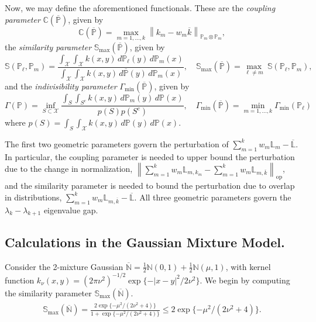 \documentclass{article}
\newcommand{\norm}[1]{\left\lVert#1\right\rVert}
\newcommand{\abs}[1]{\left \lvert #1 \right \rvert}
\newcommand{\1}{\mathbb{I}}
\newcommand{\Xset}{\mathcal{X}}
\newcommand{\Pbb}{\mathbb{P}}
\theoremstyle{alden}
\theoremstyle{aldenthm}
\theoremstyle{definition}
\theoremstyle{remark}
\begin{document}
Now, we may define the aforementioned functionals. These are the \emph{coupling parameter} $\mathbb{C}(\overline{\Pbb})$, given by
\begin{equation*}
\mathbb{C}(\overline{\Pbb}) = \max_{m = 1,\ldots,k} \norm{k_m - w_m\overline{k}}_{\Pbb_m \otimes \Pbb_m},
\end{equation*}
the \emph{similarity parameter} $\mathbb{S}_{\textrm{max}}(\overline{\Pbb})$, given by
\begin{equation*}
\mathbb{S}(\Pbb_{\ell}, \Pbb_{m}) = \frac{\int_{\Xset} \int_{\Xset} k(x,y) \,d\Pbb_{\ell}(y) \,d\Pbb_{m}(x)}{\int_{\Xset} \int_{\Xset} k(x,y) \,d\overline{\Pbb}(y) \,d\Pbb_{m}(x)}, \quad \mathbb{S}_{\textrm{max}}(\overline{\Pbb}) = \max_{\ell \neq m}~ \mathbb{S}(\Pbb_{\ell}, \Pbb_{m}),
\end{equation*}
and the \emph{indivisibility parameter} $\Gamma_{\textrm{min}}(\overline{\Pbb})$, given by
\begin{equation*}
\Gamma(\Pbb) = \inf_{S \subset \Xset }\frac{\int_{S} \int_{S^c} k(x,y) \,d\Pbb_m(y) \,d\Pbb(x)}{p(S)p(S^c)}, \quad \Gamma_{\textrm{min}}(\overline{\Pbb}) = \min_{m = 1,\ldots,k} \Gamma_{\min}(\Pbb_{\ell})
\end{equation*}
where $p(S) = \int_{S} \int_{\mathcal{X}} k(x,y) \,d\Pbb(y) \,d\Pbb(x)$.

The first two geometric parameters govern the perturbation of $\sum_{m = 1}^{k} w_m \mathbb{L}_m - \overline{\mathbb{L}}.$ In particular, the coupling parameter is needed to upper bound the perturbation due to the change in normalization, $\norm{\sum_{m = 1}^{k}w_m\mathbb{L}_{m,k_m} - \sum_{m = 1}^{k}w_m\mathbb{L}_{m,\overline{k}}}_{\textrm{op}}$, and the similarity parameter is needed to bound the perturbation due to overlap in distributions, $\sum_{m = 1}^{k}w_m\mathbb{L}_{m,\overline{k}} - \overline{\mathbb{L}}$. All three geometric parameters govern the $\lambda_k - \lambda_{k+1}$ eigenvalue gap. 

\subsection{Calculations in the Gaussian Mixture Model.}
Consider the 2-mixture Gaussian $\overline{\mathbb{N}} = \frac{1}{2}\mathbb{N}(0,1) + \frac{1}{2}\mathbb{N}(\mu,1)$, with kernel function $k_{\nu}(x,y) = (2\pi\nu^2)^{-1/2} \exp\{-\abs{x - y}^2/2\nu^2 \}$. We begin by computing the similarity parameter $\mathbb{S}_{\max}(\overline{\mathbb{N}})$.
\begin{align*}
\mathbb{S}_{\max}(\overline{\mathbb{N}}) = \frac{2\exp\{-\mu^2/(2\nu^2 + 4)\}}{1 + \exp\{-\mu^2/(2\nu^2 + 4)\}} \leq 2\exp\{-\mu^2/(2\nu^2 + 4)\}.
\end{align*}
\end{document}
